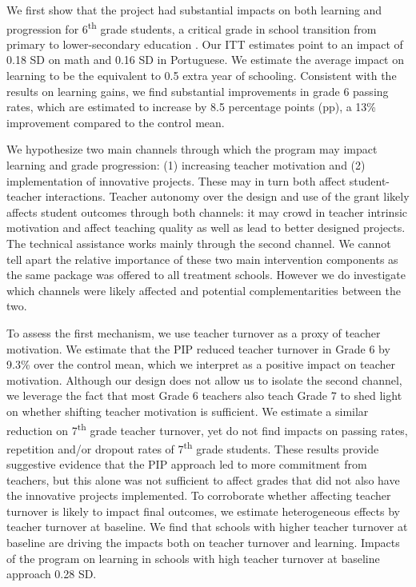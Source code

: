 \documentclass[11pt,a4paper]{article}
\begin{document}
	
	We first show that the project had substantial impacts on both learning and progression for 6\textsuperscript{th} grade students, a critical grade in school transition from primary to lower-secondary education \citep{dos2017mais}. Our ITT estimates point to an impact of 0.18 SD on math and 0.16 SD in Portuguese. We estimate the average impact on learning to be the equivalent to 0.5 extra year of schooling. Consistent with the results on learning gains, we find substantial improvements in grade 6 passing rates, which are estimated to increase by 8.5 percentage points (pp), a 13\% improvement compared to the control mean.
	
	
	We hypothesize two main channels through which the program may impact learning and grade progression: (1) increasing teacher motivation and (2) implementation of innovative projects. These may in turn both affect student-teacher interactions. Teacher autonomy over the design and use of the grant likely affects student outcomes through both channels: it may crowd in teacher intrinsic motivation and affect teaching quality as well as lead to better designed projects. The technical assistance works mainly through the second channel. We cannot tell apart the relative importance of these two main intervention components as the same package was offered to all treatment schools. However we do investigate which channels were likely affected and potential complementarities between the two.  
	
	
	To assess the first mechanism, we use teacher turnover as a proxy of teacher motivation. We estimate that the PIP reduced teacher turnover in Grade 6 by 9.3\% over the control mean, which we interpret as a positive impact on teacher motivation. Although our design does not allow us to isolate the second channel, we leverage the fact that most Grade 6 teachers also teach Grade 7 to shed light on whether shifting teacher motivation is sufficient. We estimate a similar reduction on 7\textsuperscript{th} grade teacher turnover, yet do not find impacts on passing rates, repetition and/or dropout rates of 7\textsuperscript{th} grade students. These results provide suggestive evidence that the PIP approach led to more commitment from teachers, but this alone was not sufficient to affect grades that did not also have the innovative projects implemented. To corroborate whether affecting teacher turnover is likely to impact final outcomes, we estimate heterogeneous effects by teacher turnover at baseline. We find that schools with higher teacher turnover at baseline are driving the impacts both on teacher turnover and learning. Impacts of the program on learning in schools with high teacher turnover at baseline approach 0.28 SD. 
	
\end{document}
